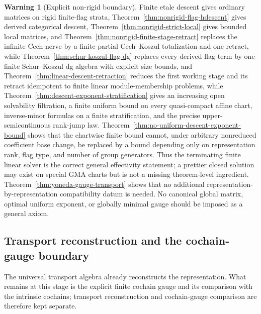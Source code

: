 \documentclass[11pt]{article}
\theoremstyle{definition}
\newtheorem{warning}[theorem]{Warning}
\begin{document}
\begin{warning}[Explicit non-rigid boundary]\label{warn:nonrigid-flag-locus}
Finite etale descent gives ordinary matrices on rigid finite-flag strata,
Theorem~\ref{thm:nonrigid-flag-hdescent} gives derived categorical descent,
Theorem~\ref{thm:nonrigid-strict-local} gives bounded local matrices, and
Theorem~\ref{thm:nonrigid-finite-stage-retract} replaces the infinite Cech
nerve by a finite partial Cech--Koszul totalization and one retract, while
Theorem~\ref{thm:schur-koszul-flag-dg} replaces every derived flag term by one
finite Schur--Koszul dg algebra with explicit size bounds, and
Theorem~\ref{thm:linear-descent-retraction} reduces the first working stage
and its retract idempotent to finite linear module-membership problems, while
Theorem~\ref{thm:descent-exponent-stratification} gives an increasing open
solvability filtration, a finite uniform bound on every quasi-compact affine
chart, inverse-minor formulas on a finite stratification, and the precise
upper-semicontinuous rank-jump law.  Theorem~\ref{thm:no-uniform-descent-exponent-bound} shows that the chartwise
finite bound cannot, under arbitrary nonreduced coefficient base change, be
replaced by a bound depending only on representation rank, flag type, and number
of group generators.  Thus the terminating finite linear solver is the correct
general effectivity statement; a prettier closed solution may exist on special
GMA charts but is not a missing theorem-level ingredient.  Theorem~\ref{thm:yoneda-gauge-transport}
shows that no additional representation-by-representation compatibility datum
is needed.  No canonical global matrix, optimal uniform exponent, or globally
minimal gauge should be imposed as a general axiom.
\end{warning}


\subsection{Transport reconstruction and the cochain-gauge boundary}

The universal transport algebra already reconstructs the representation.  What
remains at this stage is the explicit finite cochain gauge and its comparison
with the intrinsic cochains; transport reconstruction and cochain-gauge
comparison are therefore kept separate.
\end{document}
